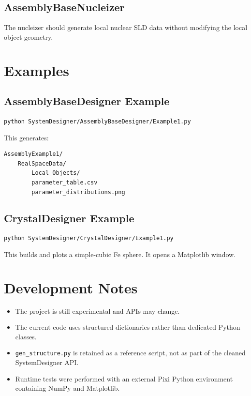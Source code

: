 \documentclass[11pt,a4paper]{article}
\begin{document}
\subsection{AssemblyBaseNucleizer}

The nucleizer should generate local nuclear SLD data without modifying the
local object geometry.

\section{Examples}

\subsection{AssemblyBaseDesigner Example}

\begin{lstlisting}[language=bash]
python SystemDesigner/AssemblyBaseDesigner/Example1.py
\end{lstlisting}

This generates:

\begin{lstlisting}
AssemblyExample1/
    RealSpaceData/
        Local_Objects/
        parameter_table.csv
        parameter_distributions.png
\end{lstlisting}

\subsection{CrystalDesigner Example}

\begin{lstlisting}[language=bash]
python SystemDesigner/CrystalDesigner/Example1.py
\end{lstlisting}

This builds and plots a simple-cubic Fe sphere. It opens a Matplotlib window.

\section{Development Notes}

\begin{itemize}
    \item The project is still experimental and APIs may change.
    \item The current code uses structured dictionaries rather than dedicated
    Python classes.
    \item \texttt{gen\_structure.py} is retained as a reference script, not as
    part of the cleaned SystemDesigner API.
    \item Runtime tests were performed with an external Pixi Python
    environment containing NumPy and Matplotlib.
\end{itemize}
\end{document}
